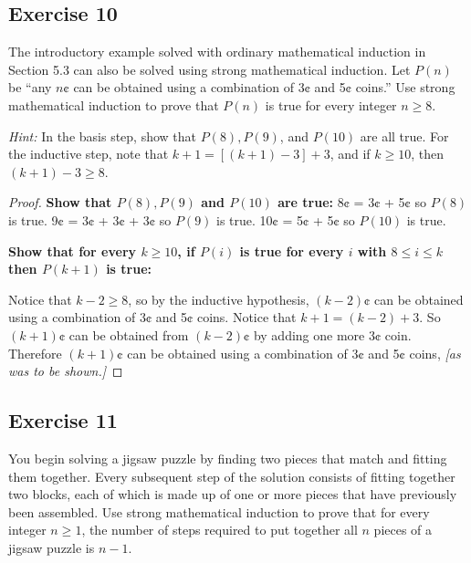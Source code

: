 \documentclass[14pt]{extarticle}
\begin{document}
\subsection{Exercise 10}
The introductory example solved with ordinary
mathematical induction in Section 5.3 can also be
solved using strong mathematical induction. Let $P(n)$
be “any $n$¢ can be obtained using a combination of
3¢ and 5¢ coins.” Use strong mathematical induction
to prove that $P(n)$ is true for every integer $n \geq 8$.

    {\it Hint:} In the basis step, show that $P(8), P(9)$,
and $P(10)$ are all true. For the inductive step, note
that $k + 1 = [(k + 1) - 3] + 3$, and if $k \geq 10$, then
$(k + 1) - 3 \geq 8$.

\begin{proof}
    {\bf Show that $P(8), P(9)$ and $P(10)$ are true:}
    8¢ = 3¢ + 5¢ so $P(8)$ is true.
    9¢ = 3¢ + 3¢ + 3¢ so $P(9)$ is true.
    10¢ = 5¢ + 5¢ so $P(10)$ is true.

        {\bf Show that for every $k \geq 10$, if $P(i)$ is true for every $i$ with $8 \leq i \leq k$ then $P(k+1)$ is true:}

    Notice that $k - 2 \geq 8$, so by the inductive hypothesis, $(k-2)$¢ can be obtained using a combination of 3¢ and 5¢ coins.
    Notice that $k + 1 = (k-2) + 3$. So $(k+1)$¢ can be obtained from $(k-2)$¢ by adding one more 3¢ coin.
    Therefore $(k+1)$¢ can be obtained using a combination of 3¢ and 5¢ coins, {\it [as was to be shown.]}
\end{proof}

\subsection{Exercise 11}
You begin solving a jigsaw puzzle by finding two pieces that match and fitting them together.
Every subsequent step of the solution consists of fitting together two blocks, each of which is made up of one or more pieces that have previously been assembled.
Use strong mathematical induction to prove that for every integer $n \geq 1$, the number of steps required to put together all $n$ pieces of a jigsaw puzzle is $n - 1$.
\end{document}
